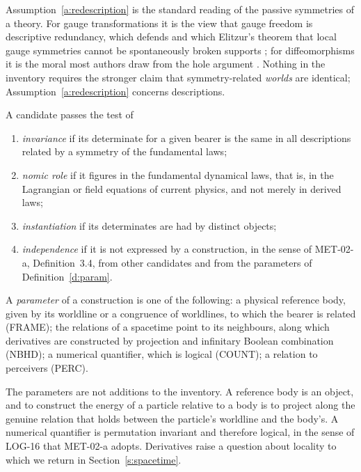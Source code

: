 \documentclass{situationist-preprint}
\begin{document}
Assumption~\ref{a:redescription} is the standard reading of the passive symmetries of a theory. For gauge transformations it is the view that gauge freedom is descriptive redundancy, which \citet{Earman2004} defends and which Elitzur's theorem that local gauge symmetries cannot be spontaneously broken supports \citep{Elitzur1975}; for diffeomorphisms it is the moral most authors draw from the hole argument \citep{EarmanNorton1987}. Nothing in the inventory requires the stronger claim that symmetry-related \emph{worlds} are identical; Assumption~\ref{a:redescription} concerns descriptions.

\begin{definition}\label{d:tests}
A candidate passes the test of
\begin{enumerate}[label=(\roman*),nosep]
\item \emph{invariance} if its determinate for a given bearer is the same in all descriptions related by a symmetry of the fundamental laws;
\item \emph{nomic role} if it figures in the fundamental dynamical laws, that is, in the Lagrangian or field equations of current physics, and not merely in derived laws;
\item \emph{instantiation} if its determinates are had by distinct objects;
\item \emph{independence} if it is not expressed by a construction, in the sense of MET-02-a, Definition~3.4, from other candidates and from the parameters of Definition~\ref{d:param}.
\end{enumerate}
\end{definition}

\begin{definition}\label{d:param}
A \emph{parameter} of a construction is one of the following: a physical reference body, given by its worldline or a congruence of worldlines, to which the bearer is related (FRAME); the relations of a spacetime point to its neighbours, along which derivatives are constructed by projection and infinitary Boolean combination (NBHD); a numerical quantifier, which is logical (COUNT); a relation to perceivers (PERC).
\end{definition}

The parameters are not additions to the inventory. A reference body is an object, and to construct the energy of a particle relative to a body is to project along the genuine relation that holds between the particle's worldline and the body's. A numerical quantifier is permutation invariant and therefore logical, in the sense of LOG-16 that MET-02-a adopts. Derivatives raise a question about locality to which we return in Section~\ref{s:spacetime}.
\end{document}

